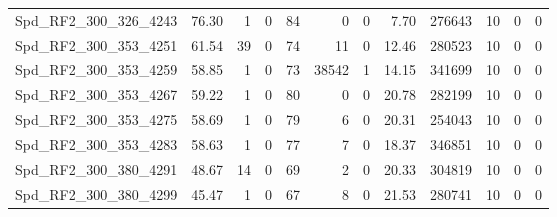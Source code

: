 \begin{longtable}[c]{@{}lrrrrrrrrrrr@{}}
Spd\_RF2\_300\_326\_4243      & 76.30                  & 1                       & 0                       & 84                     & 0                       & 0                       & 7.70                    & 276643                   & 10                       & 0                        & 0                        \\
Spd\_RF2\_300\_353\_4251      & 61.54                  & 39                      & 0                       & 74                     & 11                      & 0                       & 12.46                   & 280523                   & 10                       & 0                        & 0                        \\
Spd\_RF2\_300\_353\_4259      & 58.85                  & 1                       & 0                       & 73                     & 38542                   & 1                       & 14.15                   & 341699                   & 10                       & 0                        & 0                        \\
Spd\_RF2\_300\_353\_4267      & 59.22                  & 1                       & 0                       & 80                     & 0                       & 0                       & 20.78                   & 282199                   & 10                       & 0                        & 0                        \\
Spd\_RF2\_300\_353\_4275      & 58.69                  & 1                       & 0                       & 79                     & 6                       & 0                       & 20.31                   & 254043                   & 10                       & 0                        & 0                        \\
Spd\_RF2\_300\_353\_4283      & 58.63                  & 1                       & 0                       & 77                     & 7                       & 0                       & 18.37                   & 346851                   & 10                       & 0                        & 0                        \\
Spd\_RF2\_300\_380\_4291      & 48.67                  & 14                      & 0                       & 69                     & 2                       & 0                       & 20.33                   & 304819                   & 10                       & 0                        & 0                        \\
Spd\_RF2\_300\_380\_4299      & 45.47                  & 1                       & 0                       & 67                     & 8                       & 0                       & 21.53                   & 280741                   & 10                       & 0                        & 0                        \\

\end{longtable}
